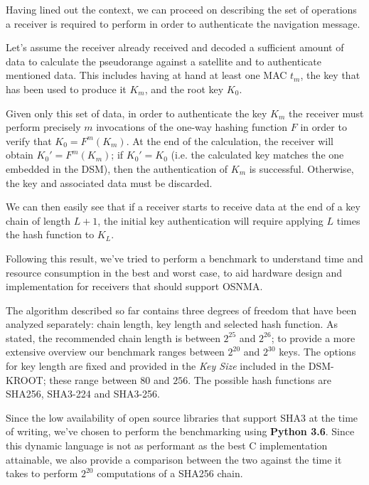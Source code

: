 \par

Having lined out the context, we can proceed on describing the set of operations
a receiver is required to perform in order to authenticate the navigation
message.

Let's assume the receiver already received and decoded a sufficient amount of
data to calculate the pseudorange against a satellite and to authenticate
mentioned data. This includes having at hand at least one MAC $t_m$, the key that
has been used to produce it $K_m$, and the root key $K_0$.

Given only this set of data, in order to authenticate the key $K_m$ the
receiver must perform precisely $m$ invocations of the one-way hashing function
$F$ in order to verify that $K_0 = F^m(K_m)$. At the end of the calculation, the
receiver will obtain $K_0' = F^m(K_m)$; if $K_0' = K_0$ (i.e. the calculated key
matches the one embedded in the DSM), then the authentication of $K_m$ is
successful. Otherwise, the key and associated data must be discarded.

We can then easily see that if a receiver starts to receive data at the end of a
key chain of length $L+1$, the initial key authentication will require applying
$L$ times the hash function to $K_L$.

\par

Following this result, we've tried to perform a benchmark to understand time and
resource consumption in the best and worst case, to aid hardware design and
implementation for receivers that should support OSNMA.

The algorithm described so far contains three degrees of freedom that have been
analyzed separately: chain length, key length and selected hash function. As
stated, the recommended chain length is between $2^{25}$ and $2^{26}$; to
provide a more extensive overview our benchmark ranges between $2^{20}$ and
$2^{30}$ keys. The options for key length are fixed and provided in the
\textit{Key Size} included in the DSM-KROOT; these range between $80$ and $256$.
The possible hash functions are SHA256, SHA3-224 and SHA3-256.

Since the low availability of open source libraries that support SHA3 at the
time of writing, we've chosen to perform the benchmarking using \textbf{Python
3.6}. Since this dynamic language is not as performant as the best C
implementation attainable, we also provide a comparison between the two against
the time it takes to perform $2^{20}$ computations of a SHA256 chain.

